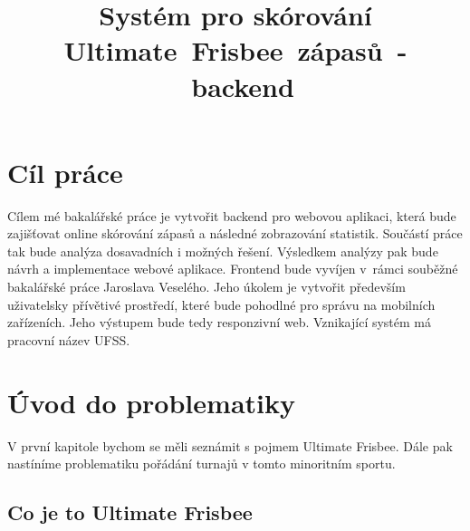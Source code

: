 \documentclass[thesis=B,czech]{FITthesis}[2012/06/26]
\title{Systém pro skórování Ultimate~Frisbee~zápasů~-~backend}
\begin{document}


\begin{introduction}
\end{introduction}

\chapter{Cíl práce}

Cílem mé bakalářské práce je vytvořit backend pro webovou aplikaci, která bude zajišťovat online
skórování zápasů a následné zobrazování statistik. Sou\-částí práce tak bude analýza dosavadních
i možných řešení. Výsledkem analýzy pak bude návrh a implementace webové aplikace. Frontend bude
vyvíjen v~rámci souběžné bakalářské práce Jaroslava Veselého. Jeho úkolem je vytvořit především
uživatelsky přívětivé prostředí, které bude pohodlné pro správu na mobilních zařízeních. Jeho
výstupem bude tedy responzivní web. Vznikající systém má pracovní název UFSS.

%
%

\chapter{Úvod do problematiky}

\indent

V první kapitole bychom se měli seznámit s pojmem Ultimate Frisbee. Dále pak nastíníme
problematiku pořádání turnajů v tomto minoritním sportu.

\section{Co je to Ultimate Frisbee}
\end{document}
